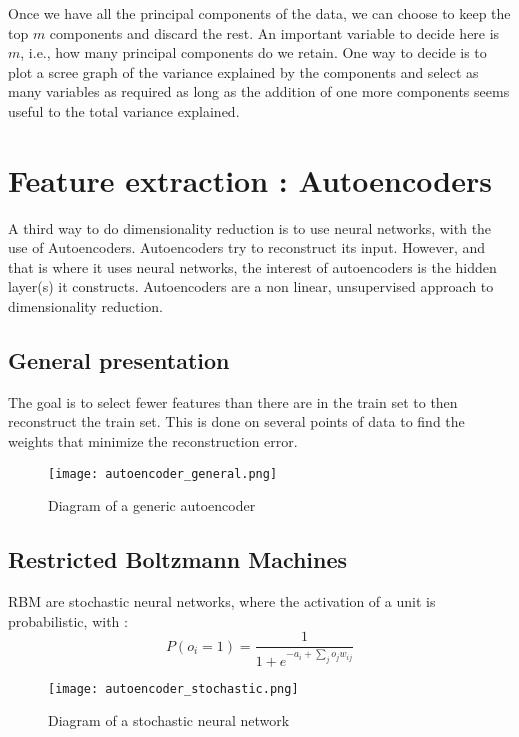 \documentclass{article}
\begin{document}
\bigskip

Once we have all the principal components of the data, we can choose to keep the top $m$ components and discard the rest. An important variable to decide here is $m$, i.e., how many principal components do we retain. One way to decide is to plot a scree graph of the variance explained by the components and select as many variables as required as long as the addition of one more components seems useful to the total variance explained.

\section{Feature extraction : Autoencoders}

A third way to do dimensionality reduction is to use neural networks, with the use of Autoencoders. Autoencoders try to reconstruct its input. However, and that is where it uses neural networks, the interest of autoencoders is the hidden layer(s) it constructs. Autoencoders are a non linear, unsupervised approach to dimensionality reduction.

\subsection{General presentation}

The goal is to select fewer features than there are in the train set to then reconstruct the train set. This is done on several points of data to find the weights that minimize the reconstruction error.

\begin{figure}[!h]
    \center
    \texttt{[image: autoencoder\_general.png]}
    \caption{Diagram of a generic autoencoder}
\end{figure}

\subsection{Restricted Boltzmann Machines}

RBM are stochastic neural networks, where the activation of a unit is probabilistic, with : \[P(o_i = 1) = \frac{1}{1+e^{-a_i+\sum_j o_j w_{ij}}}\]

\begin{figure}[!h]
    \center
    \texttt{[image: autoencoder\_stochastic.png]}
    \caption{Diagram of a stochastic neural network}
\end{figure}
\end{document}
